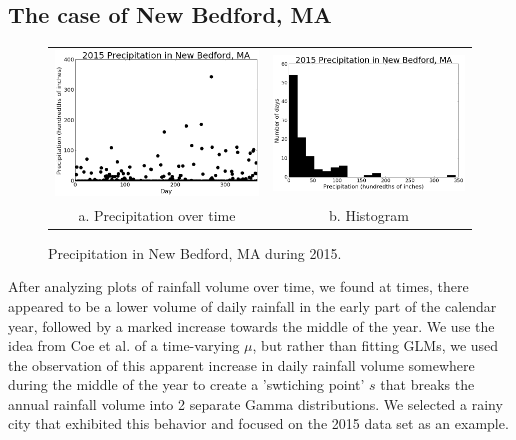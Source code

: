 \documentclass{article}
\begin{document}
\subsection{The case of New Bedford, MA}
\begin{figure}
\centering
\begin{tabular}{cc}
\includegraphics[scale=0.35]{../images/nbed_2015_rainfall_timeline.png} & \includegraphics[scale=0.35]{../images/nbed_2015_rainfall_hist.png} \\
a. Precipitation over time & b. Histogram
\end{tabular}
\caption{Precipitation in New Bedford, MA during 2015.}
\label{fig:nbed2015_timeline}
\end{figure}

After analyzing plots of rainfall volume over time, we found at times, there appeared to be a lower volume of daily rainfall in the early part of the calendar year, followed by a marked increase towards the middle of the year.  We use the idea from Coe et al. of a time-varying $\mu$, but rather than fitting GLMs, we used the observation of this apparent increase in daily rainfall volume somewhere during the middle of the year to create a 'swtiching point' $s$ that breaks the annual rainfall volume into 2 separate Gamma distributions. We selected a rainy city that exhibited this behavior and focused on the 2015 data set as an example.
\end{document}
